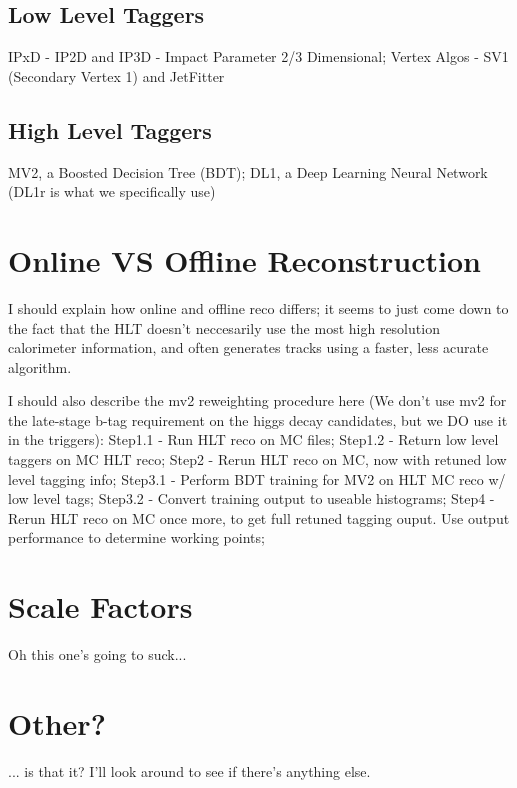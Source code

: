         \subsection{Low Level Taggers}

            IPxD - IP2D and IP3D - Impact Parameter 2/3 Dimensional; 
            Vertex Algos - SV1 (Secondary Vertex 1) and JetFitter

        \subsection{High Level Taggers}

            MV2, a Boosted Decision Tree (BDT);
            DL1, a Deep Learning Neural Network (DL1r is what we specifically use)
        \cite{bjet_id_and_performance}
        \cite{btagging_optimisation}

    \section{Online VS Offline Reconstruction}
        I should explain how online and offline reco differs;
            it seems to just come down to the fact that the HLT doesn't neccesarily use the most high resolution calorimeter information,
            and often generates tracks using a faster, less acurate algorithm.
            
        I should also describe the mv2 reweighting procedure here
            (We don't use mv2 for the late-stage b-tag requirement on the higgs decay candidates,
            but we DO use it in the triggers):
            Step1.1 - Run HLT reco on MC files;
            Step1.2 - Return low level taggers on MC HLT reco;
            Step2   - Rerun HLT reco on MC, now with retuned low level tagging info;
            Step3.1 - Perform BDT training for MV2 on HLT MC reco w/ low level tags;
            Step3.2 - Convert training output to useable histograms;
            Step4   - Rerun HLT reco on MC once more, to get full retuned tagging ouput. Use output performance to determine working points;


    \section{Scale Factors}
        Oh this one's going to suck...


    \section{Other?}
        ... is that it? I'll look around to see if there's anything else.



